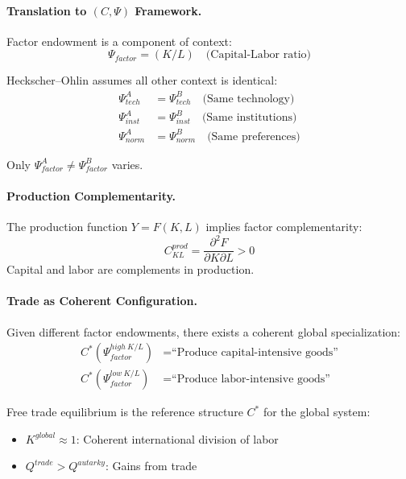\documentclass[12pt,a4paper]{article}
\begin{document}
\paragraph{Translation to $(C, \Psi)$ Framework.}
Factor endowment is a component of context:
\begin{equation}
  \Psi_{factor} = (K/L) \quad \text{(Capital-Labor ratio)}
\end{equation}

Heckscher--Ohlin assumes all other context is identical:
\begin{align}
  \Psi_{tech}^A &= \Psi_{tech}^B \quad \text{(Same technology)} \\
  \Psi_{inst}^A &= \Psi_{inst}^B \quad \text{(Same institutions)} \\
  \Psi_{norm}^A &= \Psi_{norm}^B \quad \text{(Same preferences)}
\end{align}

Only $\Psi_{factor}^A \neq \Psi_{factor}^B$ varies.

\paragraph{Production Complementarity.}
The production function $Y = F(K, L)$ implies factor complementarity:
\begin{equation}
  C_{KL}^{prod} = \frac{\partial^2 F}{\partial K \partial L} > 0
\end{equation}
Capital and labor are complements in production.

\paragraph{Trade as Coherent Configuration.}
Given different factor endowments, there exists a coherent global specialization:
\begin{align}
  C^*(\Psi_{factor}^{high\ K/L}) &= \text{``Produce capital-intensive goods''} \\
  C^*(\Psi_{factor}^{low\ K/L}) &= \text{``Produce labor-intensive goods''}
\end{align}

Free trade equilibrium is the reference structure $C^*$ for the global system:
\begin{itemize}
  \item $K^{global} \approx 1$: Coherent international division of labor
  \item $Q^{trade} > Q^{autarky}$: Gains from trade
\end{itemize}
\end{document}

